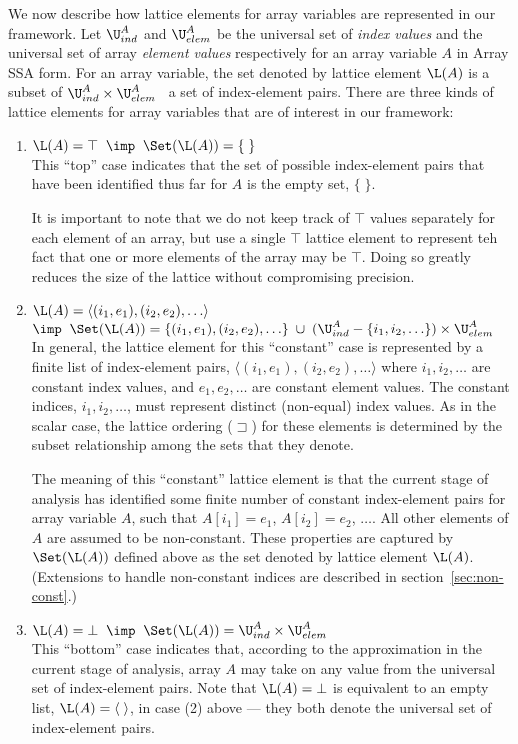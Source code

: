 We now describe how lattice elements for array variables are represented in 
our framework.
Let $\U^A_{ind}$ and $\U^A_{elem}$ be the universal set of {\it index values}
and the universal set of array {\it element values} respectively
for an array variable $A$
in Array SSA form.
For an array variable,
the set denoted by
lattice element $\L(A)$ is a subset of $\U^A_{ind} \times \U^A_{elem}$ \ie\
a set of index-element pairs.
There are three kinds of lattice elements for array variables that are of
interest in our framework:
\begin{enumerate}
\item $\L(A) = \top \;\;\imp\;\; \Set(\L(A)) = \{\;\}$\\
This ``top'' case indicates that the set of possible index-element
pairs
that have been identified thus far for $A$ is the empty set, $\{\;\}$.

It is important to note that we do not keep track of $\top$
values separately for each element of an array, but use a single 
$\top$ lattice element to represent teh fact that 
one or more elements of the array may be $\top$.
Doing so greatly reduces the size of the lattice without compromising
precision.


\item $\L(A) = \langle(i_1,e_1), (i_2,e_2), \ldots\rangle$\\
$\imp\;\; \Set(\L(A)) = \{ (i_1,e_1), (i_2,e_2), \ldots \} \;\cup\;
(\U^A_{ind}-\{i_1,i_2,\ldots\})\times \U^A_{elem}$\\
In general,
the lattice element for this ``constant'' case is represented by a finite
list
of index-element pairs, $\langle(i_1,e_1), (i_2,e_2), \ldots\rangle$
where $i_1, i_2, \ldots$ are constant index values, and 
$e_1, e_2, \ldots$ are constant element values.
The constant indices, $i_1, i_2, \ldots$, must represent distinct (non-equal)
index values.  As in the scalar case,
the lattice ordering ($\sqsupset$) for these  elements is determined by the subset
relationship among the sets that they denote.


The meaning of this ``constant'' lattice element is
that the current stage of analysis
has identified some finite number of constant index-element pairs
for array variable $A$, such
that $A[i_1] = e_1$, $A[i_2] = e_2$, $\ldots$.
All other elements of $A$ are assumed to be non-constant.
These properties are captured by $\Set(\L(A))$ defined above as the
set denoted by lattice element
$\L(A)$.
(Extensions to handle non-constant indices are
described in section~\ref{sec:non-const}.)

\item $\L(A) = \bot \;\;\imp\;\; \Set(\L(A)) =  \U^A_{ind} \times \U^A_{elem}$\\
This ``bottom''
case indicates that, according to
the approximation in the current stage of analysis, array $A$ may take on any
value from the universal set of index-element pairs.
Note that $\L(A)=\bot$ is equivalent to an empty list,
$\L(A)=\langle \; \rangle$, in case (2) above --- they both 
denote the universal set of index-element pairs.
\end{enumerate}


